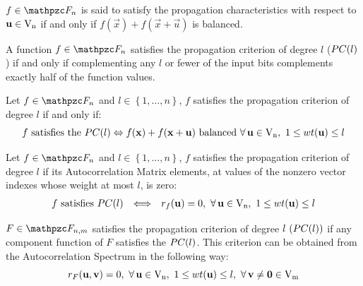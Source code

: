 \begin{definition}
$f \in \funct{F}_{n}$ is said to satisfy the propagation characteristics with respect to $\vec{u} \in \gf{V_n}$ if and only if $f(\vec{x})+f(\vec{x}+\vec{u})$ is balanced.
\end{definition}

\begin{definition}
A function $f \in \funct{F}_n$ satisfies the propagation criterion of degree $l$ ($\crit{PC}(l)$) if and only if complementing any $l$ or fewer of the input bits complements exactly half of the function values.
\end{definition}

\begin{definition}
Let $f \in \funct{F}_n$ and $l \in \left\{1,\dots,n\right\}$, $f$ satisfies the propagation criterion of degree $l$ if and only if:
\begin{equation}
f \mbox{ satisfies the }\crit{PC}(l) \Leftrightarrow f(\vec{x})+f(\vec{x}+\vec{u}) \mbox{ balanced } \fa \vec{u} \in \gf{V_n}, \ 1 \leq wt(\vec{u}) \leq l
\end{equation}
\end{definition}

\begin{theorem}
Let $f \in \funct{F}_n$ and $l \in \left\{1,\dots,n\right\}$, $f$ satisfies the propagation criterion of degree $l$ if its Autocorrelation Matrix elements, at values of the nonzero vector indexes whose weight at most $l$, is zero:
\begin{equation}
\begin{array}{rcl}
f \mbox{ satisfies }\crit{PC}(l) &\Longleftrightarrow& \R_f(\vec{u}) = 0, \ \fa \vec{u} \in \gf{V_n}, \ 1 \leq wt(\vec{u}) \leq l 
\end{array}
\end{equation}
\end{theorem}

\begin{definition}
$F \in \funct{F}_{n,m}$ satisfies the propagation criterion of degree $l \ (\crit{PC}(l))$ if any component function of $F$ satisfies the $\crit{PC}(l)$. This
  criterion can be obtained from the Autocorrelation Spectrum in the following
  way: 
\begin{equation}
\R_F(\vec{u},\vec{v})=0, \ \fa \vec{u} \in \gf{V_n}, \ 1 \leq wt(\vec{u}) \leq l, \ \fa \vec{v} \neq \vec{0} \in \gf{V_m}
\end{equation}
\end{definition}

